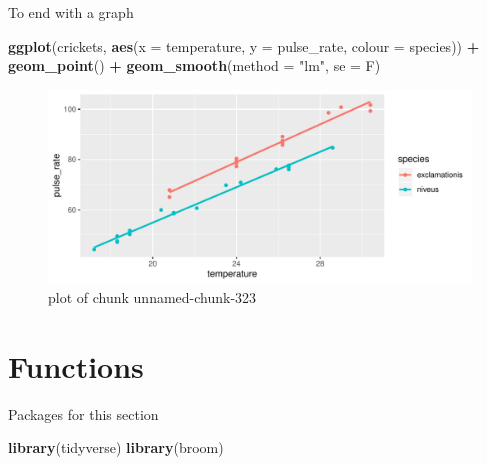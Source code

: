 \documentclass[ignorenonframetext,]{beamer}
\newenvironment{Shaded}{\begin{snugshade}}{\end{snugshade}}
\newcommand{\DataTypeTok}[1]{\textcolor[rgb]{0.13,0.29,0.53}{#1}}
\newcommand{\KeywordTok}[1]{\textcolor[rgb]{0.13,0.29,0.53}{\textbf{#1}}}
\newcommand{\NormalTok}[1]{#1}
\newcommand{\OperatorTok}[1]{\textcolor[rgb]{0.81,0.36,0.00}{\textbf{#1}}}
\newcommand{\StringTok}[1]{\textcolor[rgb]{0.31,0.60,0.02}{#1}}
\begin{document}
\begin{frame}[fragile]{To end with a graph}
\protect\hypertarget{to-end-with-a-graph}{}

\begin{Shaded}
\begin{Highlighting}[]
\KeywordTok{ggplot}\NormalTok{(crickets, }\KeywordTok{aes}\NormalTok{(}\DataTypeTok{x =}\NormalTok{ temperature, }\DataTypeTok{y =}\NormalTok{ pulse_rate,}
  \DataTypeTok{colour =}\NormalTok{ species)) }\OperatorTok{+}
\StringTok{  }\KeywordTok{geom_point}\NormalTok{() }\OperatorTok{+}\StringTok{ }\KeywordTok{geom_smooth}\NormalTok{(}\DataTypeTok{method =} \StringTok{"lm"}\NormalTok{, }\DataTypeTok{se =}\NormalTok{ F)}
\end{Highlighting}
\end{Shaded}

\begin{figure}
\centering
\includegraphics{figure/unnamed-chunk-323-1.pdf}
\caption{plot of chunk unnamed-chunk-323}
\end{figure}

\end{frame}

\hypertarget{functions}{%
\section{Functions}\label{functions}}

\begin{frame}[fragile]{Packages for this section}
\protect\hypertarget{packages-for-this-section-8}{}

\begin{Shaded}
\begin{Highlighting}[]
\KeywordTok{library}\NormalTok{(tidyverse)}
\KeywordTok{library}\NormalTok{(broom)}
\end{Highlighting}
\end{Shaded}

\end{frame}
\end{document}
